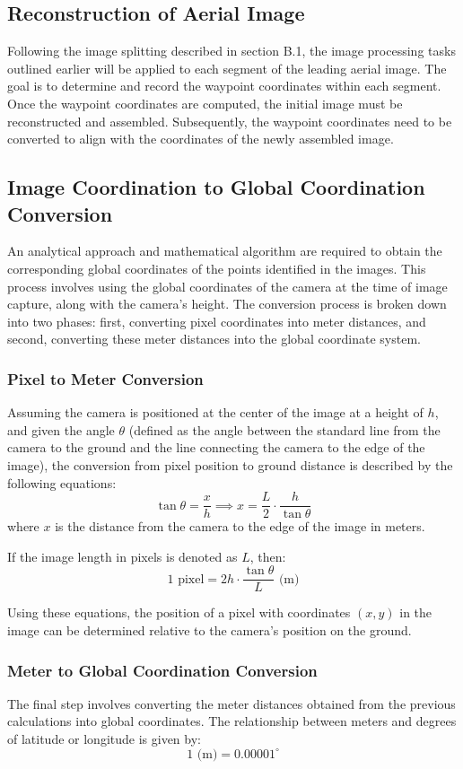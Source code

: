 \documentclass[conference]{IEEEtran}
\begin{document}
\subsection{Reconstruction of Aerial Image}
Following the image splitting described in section B.1, the image processing tasks outlined earlier will be applied to each segment of the leading aerial image. The goal is to determine and record the waypoint coordinates within each segment. Once the waypoint coordinates are computed, the initial image must be reconstructed and assembled. Subsequently, the waypoint coordinates need to be converted to align with the coordinates of the newly assembled image.

\subsection{Image Coordination to Global Coordination Conversion}
An analytical approach and mathematical algorithm are required to obtain the corresponding global coordinates of the points identified in the images. This process involves using the global coordinates of the camera at the time of image capture, along with the camera's height. The conversion process is broken down into two phases: first, converting pixel coordinates into meter distances, and second, converting these meter distances into the global coordinate system.

\subsubsection{Pixel to Meter Conversion}
Assuming the camera is positioned at the center of the image at a height of \( h \), and given the angle \( \theta \) (defined as the angle between the standard line from the camera to the ground and the line connecting the camera to the edge of the image), the conversion from pixel position to ground distance is described by the following equations:
\[
\tan \theta = \frac{x}{h} \implies x = \frac{L}{2} \cdot \frac{h}{\tan \theta}
\]
where \( x \) is the distance from the camera to the edge of the image in meters.

If the image length in pixels is denoted as \( L \), then:
\[
1 \text{ pixel} = 2h \cdot \frac{\tan \theta}{L} \text{ (m)}
\]

Using these equations, the position of a pixel with coordinates \((x, y)\) in the image can be determined relative to the camera's position on the ground.

\subsubsection{Meter to Global Coordination Conversion}
The final step involves converting the meter distances obtained from the previous calculations into global coordinates. The relationship between meters and degrees of latitude or longitude is given by:
\[
1 \text{ (m)} = 0.00001^\circ
\]
\end{document}
